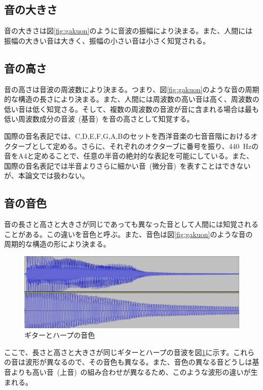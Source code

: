 \subsection{音の大きさ}

音の大きさは図\ref{fig:gakuon}のように音波の振幅により決まる。また、人間には振幅の大きい音は大きく、振幅の小さい音は小さく知覚される。

\subsection{音の高さ}

音の高さは音波の周波数により決まる。つまり、図\ref{fig:gakuon}のような音の周期的な構造の長さにより決まる。また、人間には周波数の高い音は高く、周波数の低い音は低く知覚さる。そして、複数の周波数の音波が音に含まれる場合は最も低い周波数成分の音波~(基音)~を音の高さとして知覚する。

国際の音名表記では、C,D,E,F,G,A,Bのセットを西洋音楽の七音音階におけるオクターブとして定める。さらに、それぞれのオクターブに番号を振り、440~Hzの音をA4と定めることで、任意の半音の絶対的な表記を可能にしている。また、国際の音名表記では半音よりさらに細かい音~(微分音)~を表すことはできないが、本論文では扱わない。

\subsection{音の音色}

音の長さと高さと大きさが同じであっても異なった音として人間には知覚されることがある。この違いを音色と呼ぶ。また、音色は図\ref{fig:gakuon}のような音の周期的な構造の形により決まる。

\begin{figure}[b]
\begin{center}
\includegraphics[width=\hsize]{figure/c4_guitar_harp.png}
\caption{ギターとハープの音色}
\label{fig:guitar_harp_comp}
\end{center}
\end{figure}

ここで、長さと高さと大きさが同じギターとハープの音波を図\ref{fig:guitar_harp_comp}に示す。これらの音は波形が異なるので、その音色も異なる。また、音色の異なる音どうしは基音よりも高い音~(上音)~の組み合わせが異なるため、このような波形の違いが生まれる。

